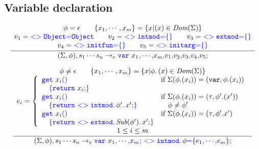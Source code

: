 \documentclass[a4paper]{article}
\newcommand{\code}[1]{\textcolor{blue}{\tt #1}}
\newcommand{\mydot}{.\,}
\newcommand{\var}{{\tt{var}}}
\newcommand{\If}{\mbox{if}}
\begin{document}
\subsection{Variable declaration}
\begin{equation*}
\frac{
    \begin{array}{c}
    \phi = \epsilon \qquad \{ x_1, \cdots, x_m \} = \{ x | (x) \in \emph{Dom} (\Sigma) \} \\
    v_1 = \code{<>Object} \code{=} \code{Object} \qquad
    v_2 = \code{<>intmod} \code{=} \code{\{\}} \qquad
    v_3 = \code{<>extmod} \code{=} \code{\{\}} \\
    v_4 = \code{<>initfun} \code{=} \code{\{\}} \qquad
    v_5 = \code{<>initarg} \code{=} \code{\{\}} \\
    \end{array}
}{
    (\Sigma, \phi), s_1 \cdots s_n \rightarrow_v \code{var}\ x_1 \code{,} \cdots \code{,} x_m \code{,} v_1 \code{,} v_2 \code{,} v_3 \code{,} v_4 \code{,} v_5 \code{;}
}
\end{equation*}

\begin{equation*}
\frac{
    \begin{array}{c}
    \phi \ne \epsilon \qquad \{ x_1, \cdots, x_m \} = \{ x | \phi \code{\mydot} (x) \in \emph{Dom} (\Sigma) \} \\
    e_i = \left\{\begin{array}{ll}
    \code{get}\ x_i \code{()} & \If\ \Sigma(\phi.(x_i)) = (\var, \phi.(x_i)) \\
    \quad \code{\{} \code{return}\ x_i \code{;} \code{\}} & \\
    \code{get}\ x_i \code{()} & \If\ \Sigma(\phi.(x_i)) = (\tau, \phi'.(x')) \\
    \quad \code{\{} \code{return}\ \code{<>intmod \mydot} \phi' \code{\mydot} x' \code{;} \code{\}} & \quad \phi \ne \phi' \\
    \code{get}\ x_i \code{()} & \If\ \Sigma(\phi.(x_i)) = (\tau, \phi'.x') \\
    \quad \code{\{} \code{return}\ \code{<>extmod \mydot} \emph{Sub} (\phi') \code{\mydot} x' \code{;} \code{\}} & \\
    \end{array}\right. \\
    1 \le i \le m \\
    \end{array}
}{
    (\Sigma, \phi), s_1 \cdots s_n \rightarrow_v
    \code{var}\ x_1 \code{,} \cdots \code{,} x_m \code{;}\ 
    \code{<>intmod} \code{\mydot} \phi \code{=} \code{\{} e_1 \code{,} \cdots \code{,} e_m \code{\};}
}
\end{equation*}
\end{document}
